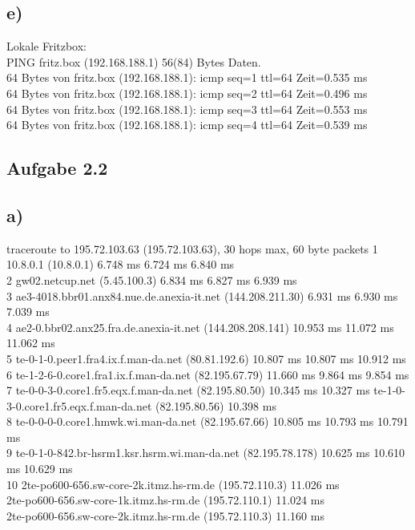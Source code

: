 \documentclass{article}
\begin{document}
	\subsection*{e)}
	Lokale Fritzbox: \\
	PING fritz.box (192.168.188.1) 56(84) Bytes Daten. \\
	64 Bytes von fritz.box (192.168.188.1): icmp seq=1 ttl=64 Zeit=0.535 ms \\
	64 Bytes von fritz.box (192.168.188.1): icmp seq=2 ttl=64 Zeit=0.496 ms \\
	64 Bytes von fritz.box (192.168.188.1): icmp seq=3 ttl=64 Zeit=0.553 ms \\
	64 Bytes von fritz.box (192.168.188.1): icmp seq=4 ttl=64 Zeit=0.539 ms 
	
	\subsection*{Aufgabe 2.2}
	\subsection*{a)}
	traceroute to 195.72.103.63 (195.72.103.63), 30 hops max, 60 byte packets
	1  10.8.0.1 (10.8.0.1)  6.748 ms  6.724 ms  6.840 ms \\
	2  gw02.netcup.net (5.45.100.3)  6.834 ms  6.827 ms  6.939 ms \\
	3  ae3-4018.bbr01.anx84.nue.de.anexia-it.net (144.208.211.30)  6.931 ms  6.930 ms  7.039 ms \\
	4  ae2-0.bbr02.anx25.fra.de.anexia-it.net (144.208.208.141)  10.953 ms  11.072 ms  11.062 ms \\
	5  te-0-1-0.peer1.fra4.ix.f.man-da.net (80.81.192.6)  10.807 ms  10.807 ms  10.912 ms \\
	6  te-1-2-6-0.core1.fra1.ix.f.man-da.net (82.195.67.79)  11.660 ms  9.864 ms  9.854 ms
	7  te-0-0-3-0.core1.fr5.eqx.f.man-da.net (82.195.80.50)  10.345 ms  10.327 ms te-1-0-3-0.core1.fr5.eqx.f.man-da.net (82.195.80.56)  10.398 ms \\
	8  te-0-0-0-0.core1.hmwk.wi.man-da.net (82.195.67.66)  10.805 ms  10.793 ms  10.791 ms \\
	9  te-0-1-0-842.br-hsrm1.ksr.hsrm.wi.man-da.net (82.195.78.178)  10.625 ms  10.610 ms  10.629 ms \\
	10  2te-po600-656.sw-core-2k.itmz.hs-rm.de (195.72.110.3)  11.026 ms \\ 2te-po600-656.sw-core-1k.itmz.hs-rm.de (195.72.110.1)  11.024 ms \\ 2te-po600-656.sw-core-2k.itmz.hs-rm.de (195.72.110.3)  11.160 ms \\
	
\end{document}
